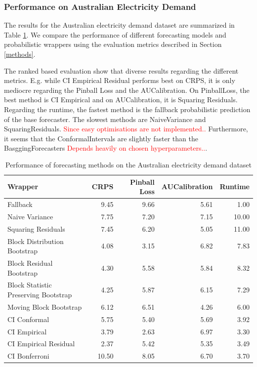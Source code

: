\subsubsection{Performance on Australian Electricity Demand}
The results for the Australian electricity demand dataset are summarized in Table \ref{table:aus_elec_results}. We compare the performance of different forecasting models and probabilistic wrappers using the evaluation metrics described in Section \ref{methods}. 

The ranked based evaluation show that diverse results regarding the different metrics. E.g. while CI Empirical Residual performs best on CRPS, it is only mediocre regarding the Pinball Loss and the AUCalibration. On PinballLoss, the best method is CI Empirical and on AUCalibration, it is Squaring Residuals. Regarding the runtime, the fastest method is the fallback probabilistic prediction of the base forecaster. The slowest methods are NaiveVariance and SquaringResiduals. \textcolor{red}{Since easy optimisations are not implemented..} Furthermore, it seems that the ConformalIntervals are slightly faster than the BasggingForecasters \textcolor{red}{Depends heavily on chosen hyperparameters..}.

\begin{table}[h]
    \centering
    \caption{Performance of forecasting methods on the Australian electricity demand dataset}
    \label{table:aus_elec_results}
\begin{tabular}{lrrrr}
\toprule
Wrapper & CRPS & Pinball Loss & AUCalibration & Runtime \\
\midrule
Fallback & 9.45 & 9.66 & 5.61 & 1.00 \\
Naive Variance & 7.75 & 7.20 & 7.15 & 10.00 \\
Squaring Residuals & 7.45 & 6.20 & 5.05 & 11.00 \\
Block Distribution Bootstrap & 4.08 & 3.15 & 6.82 & 7.83 \\
Block Residual Bootstrap & 4.30 & 5.58 & 5.84 & 8.32 \\
Block Statistic Preserving Bootstrap & 4.25 & 5.87 & 6.15 & 7.29 \\
Moving Block Bootstrap & 6.12 & 6.51 & 4.26 & 6.00 \\
CI Conformal & 5.75 & 5.40 & 5.69 & 3.92 \\
CI Empirical & 3.79 & 2.63 & 6.97 & 3.30 \\
CI Empirical Residual & 2.37 & 5.42 & 5.35 & 3.49 \\
CI Bonferroni  & 10.50 & 8.05 & 6.70 & 3.70 \\
\bottomrule
\end{tabular}

\end{table}

